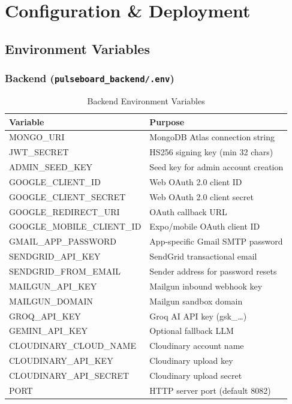 \documentclass[12pt,a4paper]{report}
\begin{document}
\chapter{Configuration \& Deployment}

\section{Environment Variables}

\subsection{Backend (\texttt{pulseboard\_backend/.env})}

\begin{table}[H]
\centering
{}
\begin{tabularx}{\textwidth}{>{\ttfamily\small}l X}
\rowcolor{tableheadbg}
\color{white}\normalfont Variable & \color{white}Purpose \\
\toprule
MONGO\_URI              & MongoDB Atlas connection string \\
JWT\_SECRET             & HS256 signing key (min 32 chars) \\
ADMIN\_SEED\_KEY        & Seed key for admin account creation \\
GOOGLE\_CLIENT\_ID      & Web OAuth 2.0 client ID \\
GOOGLE\_CLIENT\_SECRET  & Web OAuth 2.0 client secret \\
GOOGLE\_REDIRECT\_URI   & OAuth callback URL \\
GOOGLE\_MOBILE\_CLIENT\_ID & Expo/mobile OAuth client ID \\
GMAIL\_APP\_PASSWORD    & App-specific Gmail SMTP password \\
SENDGRID\_API\_KEY      & SendGrid transactional email \\
SENDGRID\_FROM\_EMAIL   & Sender address for password resets \\
MAILGUN\_API\_KEY       & Mailgun inbound webhook key \\
MAILGUN\_DOMAIN         & Mailgun sandbox domain \\
GROQ\_API\_KEY          & Groq AI API key (gsk\_\ldots) \\
GEMINI\_API\_KEY        & Optional fallback LLM \\
CLOUDINARY\_CLOUD\_NAME & Cloudinary account name \\
CLOUDINARY\_API\_KEY    & Cloudinary upload key \\
CLOUDINARY\_API\_SECRET & Cloudinary upload secret \\
PORT                    & HTTP server port (default 8082) \\
\bottomrule
\end{tabularx}
\caption{Backend Environment Variables}
\end{table}
\end{document}

